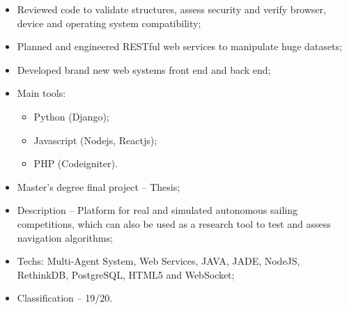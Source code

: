\documentclass[10pt,a4paper]{altacv}
\begin{document}
\divider
%



\begin{itemize}
  \item Reviewed code to validate structures, assess security and verify browser, device and operating system compatibility;
  \item Planned and engineered RESTful web services to manipulate huge datasets;
  \item Developed brand new web systems front end and back end;
  \item Main tools:
  \begin{itemize}
    \item Python (Django);
    \item Javascript (Nodejs, Reactjs);
    \item PHP (Codeigniter).
  \end{itemize}
\end{itemize}





\divider



\medskip

\clearpage

\iffalse




\begin{itemize}
  \item Master's degree final project -- Thesis;
  \item Description -- Platform for real and simulated autonomous sailing competitions, which can also be used as a research tool to test and assess navigation algorithms;
  \item Techs: Multi-Agent System, Web Services, JAVA, JADE, NodeJS, RethinkDB, PostgreSQL, HTML5 and WebSocket;
  \item Classification -- 19/20.
\end{itemize}
\end{document}
